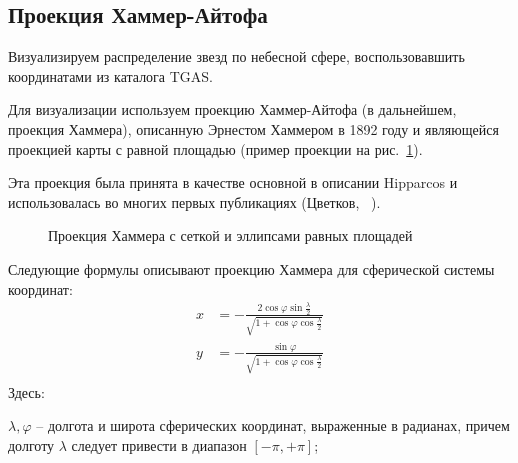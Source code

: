 \documentclass[14pt]{article} %
\begin{document}
\subsection{Проекция Хаммер-Айтофа}\label{sub:hammer}

Визуализируем распределение звезд по небесной сфере, воспользовавшить координатами из каталога TGAS. 

Для визуализации используем проекцию Хаммер-Айтофа (в дальнейшем, проекция Хаммера), описанную Эрнестом Хаммером в 1892 году и являющейся проекцией карты с равной площадью (пример проекции на рис.~\ref{img:hammtiss}).

Эта проекция была принята в качестве основной в описании Hipparcos и использовалась во многих первых публикациях (Цветков, ~\cite{book:hipparcos}).

\begin{figure}[h!]
\caption{Проекция Хаммера с сеткой и эллипсами равных площадей}
\label{img:hammtiss}
\end{figure}

Следующие формулы описывают проекцию Хаммера для
сферической системы координат:
\begin{equation*}
\begin{array}{cl}
x&=-\frac{2  \cos \varphi \sin \frac{\lambda}{2}}{\sqrt{1 + \cos \varphi \cos \frac{\lambda}{2}}}\\
y&=-\frac{\sin \varphi}{\sqrt{1 + \cos \varphi \cos \frac{\lambda}{2}}}\\
\end{array}
\end{equation*}
Здесь:

$\lambda, \varphi$ – долгота и широта сферических координат, выраженные в радианах, причем долготу $\lambda$ следует привести в диапазон $\left[ -\pi,+\pi\right]$;
\end{document}
